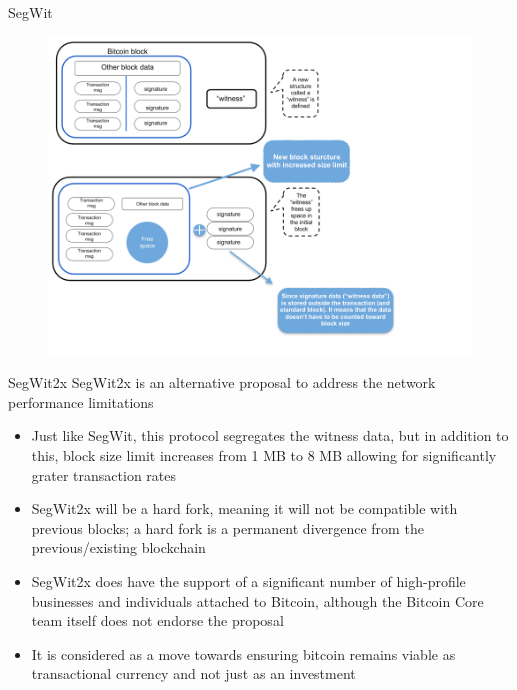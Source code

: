 \documentclass[9pt]{beamer}
\begin{document}
\begin{frame}{SegWit}
	\begin{figure}[]
		\centering
		\includegraphics  [scale=0.3]{Images/segwit2}
	\end{figure}
\end{frame}


\begin{frame}{SegWit2x}
	SegWit2x is an alternative proposal to address the network performance limitations
	\begin{itemize}
		\item Just like SegWit, this protocol segregates the witness data, but in addition to this, block size limit increases from 1 MB to 8 MB allowing for significantly grater transaction rates
		\item SegWit2x will be a hard fork, meaning it will not be compatible with previous blocks; a hard fork is a permanent divergence from the previous/existing blockchain
		\item SegWit2x does have the support of a significant number of high-profile businesses and individuals attached to Bitcoin, although the Bitcoin Core team itself does not endorse the proposal
		\item It is considered as a move towards ensuring bitcoin remains viable as transactional currency and not just as an investment
	\end{itemize}
\end{frame}

\end{document}

